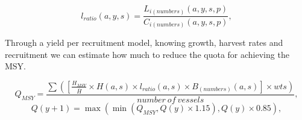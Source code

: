 \documentclass[12pt,oneline,a4paper,numbib]{ouparticle}
\numberwithin{equation}{subsection} %
\begin{document}
% 





 
\begin{equation}
 l_{ratio} (a, y, s) = \frac
                {L_{i (numbers)}(a, y, s, p)}
                {C_{i (numbers)}(a, y, s, p)},
\end{equation}

Through a yield per recruitment model, knowing growth, harvest rates and recruitment we can estimate how much to reduce the quota for achieving the MSY. 

\begin{equation}
 Q_{MSY} = \frac
                {\sum( [\frac{H_{MSY}}{\bar{H}} \times H (a, s) \times l_{ratio} (a, s) \times B_{(numbers)}(a, s)] \times wts) }
                {number\  of\  vessels}, 
\end{equation}
\begin{equation}
 Q (y+1) = \max( \min(Q_{MSY}, Q(y) \times 1.15), Q(y) \times 0.85), 
\end{equation}




        
\end{document}
